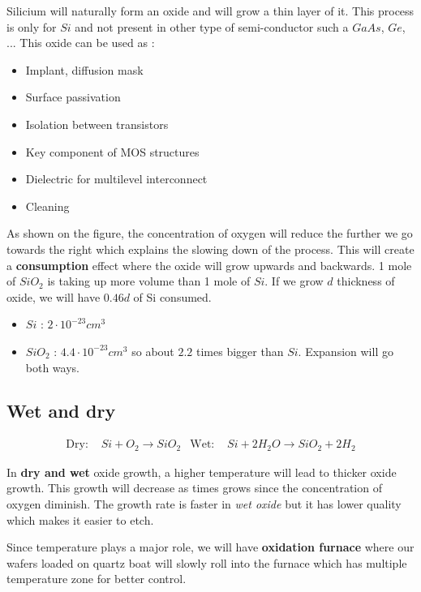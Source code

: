 \documentclass{report}
\begin{document}
Silicium will naturally form an oxide and will grow a thin layer of it. This process is only for $Si$ and not present in other type of semi-conductor such a $GaAs$, $Ge$, ... This oxide can be used as :

\begin{itemize}
    \item Implant, diffusion mask
    \item Surface passivation
    \item Isolation between transistors
    \item Key component of MOS structures
    \item Dielectric for multilevel interconnect
    \item Cleaning
\end{itemize}

As shown on the figure, the concentration of oxygen will reduce the further we go towards the right which explains the slowing down of the process. This will create a \textbf{consumption} effect where the oxide will grow upwards and backwards. 1 mole of $SiO_2$ is taking up more volume than 1 mole of $Si$. If we grow $d$ thickness of oxide, we will have $0.46d$ of Si consumed.

\begin{itemize}
    \item $Si$ : $2\cdot 10^{-23} cm^3$
    \item $SiO_2$ : $4.4\cdot 10^{-23} cm^3$ so about $2.2$ times bigger than $Si$. Expansion will go both ways.
\end{itemize}

\subsection{Wet and dry}

\begin{align}
    \text{Dry: }& Si + O_2 \rightarrow SiO_2 & \text{Wet: }& Si + 2H_2O \rightarrow SiO_2 + 2H_2
\end{align}

In \textbf{dry and wet} oxide growth, a higher temperature will lead to thicker oxide growth. This growth will decrease as times grows since the concentration of oxygen diminish. The growth rate is faster in \textit{wet oxide} but it has lower quality which makes it easier to etch.

Since temperature plays a major role, we will have \textbf{oxidation furnace} where our wafers loaded on quartz boat will slowly roll into the furnace which has multiple temperature zone for better control.
\end{document}
